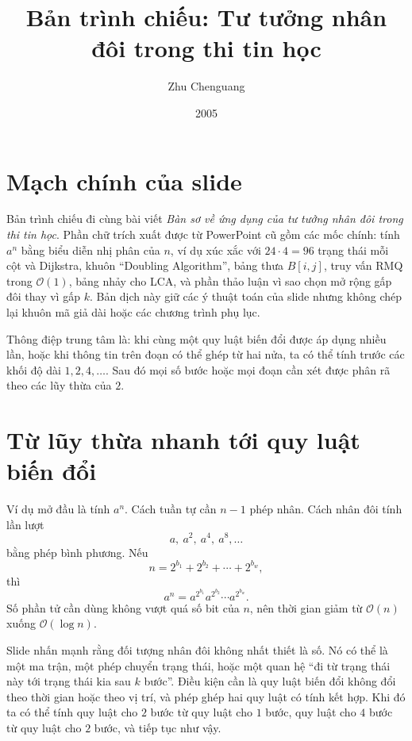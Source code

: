 \documentclass[11pt]{article}
\title{Bản trình chiếu: Tư tưởng nhân đôi trong thi tin học}
\author{Zhu Chenguang}
\date{2005}
\newcommand{\Oh}{\mathcal{O}}
\begin{document}
\maketitle


\section{Mạch chính của slide}

Bản trình chiếu đi cùng bài viết \emph{Bàn sơ về ứng dụng của tư tưởng nhân
đôi trong thi tin học}. Phần chữ trích xuất được từ PowerPoint cũ gồm các mốc
chính: tính \(a^n\) bằng biểu diễn nhị phân của \(n\), ví dụ xúc xắc với
\(24\cdot4=96\) trạng thái mỗi cột và Dijkstra, khuôn ``Doubling Algorithm'',
bảng thưa \(B[i,j]\), truy vấn RMQ trong \(\Oh(1)\), bảng nhảy cho LCA, và
phần thảo luận vì sao chọn mở rộng gấp đôi thay vì gấp \(k\). Bản dịch này
giữ các ý thuật toán của slide nhưng không chép lại khuôn mã giả dài hoặc các
chương trình phụ lục.

Thông điệp trung tâm là: khi cùng một quy luật biến đổi được áp dụng nhiều
lần, hoặc khi thông tin trên đoạn có thể ghép từ hai nửa, ta có thể tính trước
các khối độ dài \(1,2,4,\ldots\). Sau đó mọi số bước hoặc mọi đoạn cần xét
được phân rã theo các lũy thừa của \(2\).

\section{Từ lũy thừa nhanh tới quy luật biến đổi}

Ví dụ mở đầu là tính \(a^n\). Cách tuần tự cần \(n-1\) phép nhân. Cách nhân
đôi tính lần lượt
\[
  a,\ a^2,\ a^4,\ a^8,\ldots
\]
bằng phép bình phương. Nếu
\[
  n=2^{b_1}+2^{b_2}+\cdots+2^{b_w},
\]
thì
\[
  a^n=a^{2^{b_1}}a^{2^{b_2}}\cdots a^{2^{b_w}}.
\]
Số phần tử cần dùng không vượt quá số bit của \(n\), nên thời gian giảm từ
\(\Oh(n)\) xuống \(\Oh(\log n)\).

Slide nhấn mạnh rằng đối tượng nhân đôi không nhất thiết là số. Nó có thể là
một ma trận, một phép chuyển trạng thái, hoặc một quan hệ ``đi từ trạng thái
này tới trạng thái kia sau \(k\) bước''. Điều kiện cần là quy luật biến đổi
không đổi theo thời gian hoặc theo vị trí, và phép ghép hai quy luật có tính
kết hợp. Khi đó ta có thể tính quy luật cho \(2\) bước từ quy luật cho \(1\)
bước, quy luật cho \(4\) bước từ quy luật cho \(2\) bước, và tiếp tục như vậy.
\end{document}
